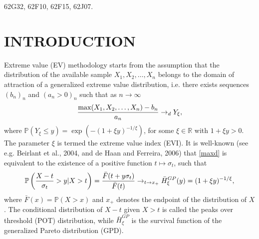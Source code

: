 \documentclass[twoside,leqno,11pt]{article}
\begin{document}
\begin{ams}
62G32, 62F10, 62F15, 62J07.
\end{ams}


\newpage     %
\section{INTRODUCTION}  %
\label{Sec1}              %

\noindent Extreme value (EV) methodology starts from the assumption that the distribution of the available sample $X_1, X_2,\ldots,X_n$ belongs to the domain of attraction of a generalized extreme value distribution, i.e.  there exists sequences $(b_n)_n$ and $(a_n>0)_n$ such that as $n \to \infty$
\begin{equation}
{\max (X_1, X_2,\ldots,X_n)-b_n \over a_n} \to _d Y_{\xi},
\label{maxd}
\end{equation}
where $\mathbb{P} (Y_\xi \leq y) = \exp (-(1+\xi y)^{-1/\xi})$, for some $\xi \in \mathbb{R}$ with $1+\xi y>0$. The parameter $\xi$ is termed the extreme value index (EVI). It is well-known (see e.g. Beirlant et al., 2004, and de Haan and Ferreira, 2006) that \eqref{maxd} is equivalent to the existence of a positive function $t \mapsto \sigma_t$, such that 
\begin{equation}
\mathbb{P}\left({X-t \over \sigma_t} >y| X>t \right)
= {\bar{F}(t+y\sigma_t) \over \bar{F}(t)} \to_{t \to x_+}
\bar{H}^{GP}_{\xi}(y)= (1+\xi y)^{-1/\xi},  
\label{POT}
\end{equation}
where $\bar{F}(x)=\mathbb{P}(X>x)$   and $x_+$ denotes the endpoint of the distribution of $X$. The conditional distribution of $X-t$ given $X>t$ is called the peaks over threshold (POT) distribution, while $\bar{H}_{\xi}^{GP}$ is the survival function of the generalized Pareto distribution (GPD).\\
\end{document}
